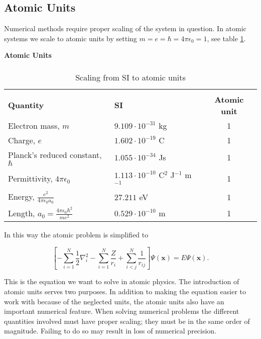 \subsection{Atomic Units}

Numerical methods require proper scaling of the system in
question. In atomic systems we scale to atomic units by setting
$m=e=\hbar=4\pi\epsilon_0=1$, see table \ref{atomicUnits}. 

\begin{table}[hbtp]
\begin{center} {\large \bf Atomic Units} \\ 
$\phantom{a}$ \\
\begin{tabular}{llc}
\hline\\ 
{\bf Quantity}                 & {\bf SI}               & {\bf Atomic unit}\\
Electron mass, $m$               & $9.109\cdot 10^{-31}$ kg & 1 \\
Charge, $e$                      & $1.602\cdot 10^{-19}$ C  & 1 \\
Planck's reduced constant, $\hbar$& $1.055\cdot 10^{-34}$ Js& 1 \\       
Permittivity, $4\pi\epsilon_0$   & $1.113\cdot 10^{-10}$ C$^2$ J$^{-1}$ m$^{-1}$&1\\
Energy, $\frac{e^2}{4\pi\epsilon_0 a_0}$ & $27.211$ eV       & 1 \\
Length, $a_0=\frac{4\pi\epsilon_0 \hbar^2}{me^2}$&$0.529\cdot10^{-10}$ m&1\\ [10pt]      
\hline
\end{tabular} 
\end{center}
\caption{Scaling from SI to atomic units}
\label{atomicUnits}
\end{table}

In this way the atomic problem is simplified to

\begin{equation}
  \left[-\sum_{i=1}^N \frac{1}{2} \nabla^2_i 
    - \sum_{i=1}^N \frac{Z}{r_i} + \sum_{i<j}^N \frac{1}{r_{ij}} 
    \right] \Psi(\mathbf{x}) = E \Psi(\mathbf{x}).
  \label{SchrodingerBornOppenheimerAtomicUnits}
\end{equation}

This is the equation we want to solve in atomic physics. The
introduction of atomic units serves two purposes. In addition to
making the equation easier to work with because of the neglected
units, the atomic units also have an important numerical feature. When
solving numerical problems the different quantities involved must have
proper scaling; they must be in the same order of magnitude. Failing
to do so may result in loss of numerical precision.


